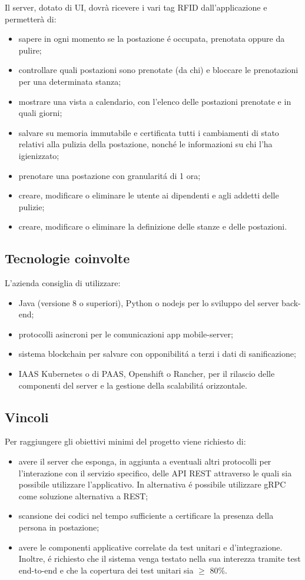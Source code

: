 Il server, dotato di UI, dovrà ricevere i vari tag RFID dall'applicazione e permetterà di:
\begin{itemize}
	\item sapere in ogni momento se la postazione \'e occupata, prenotata oppure da pulire;
	\item controllare quali postazioni sono prenotate (da chi) e bloccare le prenotazioni per una determinata stanza;
	\item mostrare una vista a calendario, con l’elenco delle postazioni prenotate e in quali giorni;
	\item salvare su memoria immutabile e certificata tutti i cambiamenti di stato relativi alla pulizia della postazione, nonch\'e le informazioni su chi l'ha igienizzato;
	\item prenotare una postazione con granularit\'a di 1 ora;
	\item creare, modificare o eliminare le utente ai dipendenti e agli addetti delle pulizie;
	\item creare, modificare o eliminare la definizione delle stanze e delle postazioni.
\end{itemize}

\subsection{Tecnologie coinvolte}
L'azienda consiglia di utilizzare:
\begin{itemize}
\item Java (versione 8 o superiori), Python o nodejs per lo sviluppo del server back-end;
\item protocolli asincroni per le comunicazioni app mobile-server;
\item sistema blockchain per salvare con opponibilit\'a a terzi i dati di sanificazione;
\item IAAS Kubernetes o di PAAS, Openshift o Rancher, per il rilascio delle componenti del server e la gestione della scalabilit\'a orizzontale.
\end{itemize}

\subsection{Vincoli}
Per raggiungere gli obiettivi minimi del progetto viene richiesto di:
\begin{itemize}
\item avere il server che esponga, in aggiunta a eventuali altri protocolli per l’interazione con il servizio specifico, delle API REST attraverso le quali sia possibile utilizzare l'applicativo. In alternativa \'e possibile utilizzare gRPC come soluzione alternativa a REST;
\item scansione dei codici nel tempo sufficiente a certificare la presenza della persona in postazione;
\item avere le componenti applicative correlate da test unitari e d’integrazione. Inoltre, \'e richiesto che il sistema venga testato nella sua interezza tramite test end-to-end e che la copertura dei test unitari sia $\geq$ 80\%.
\end{itemize}

